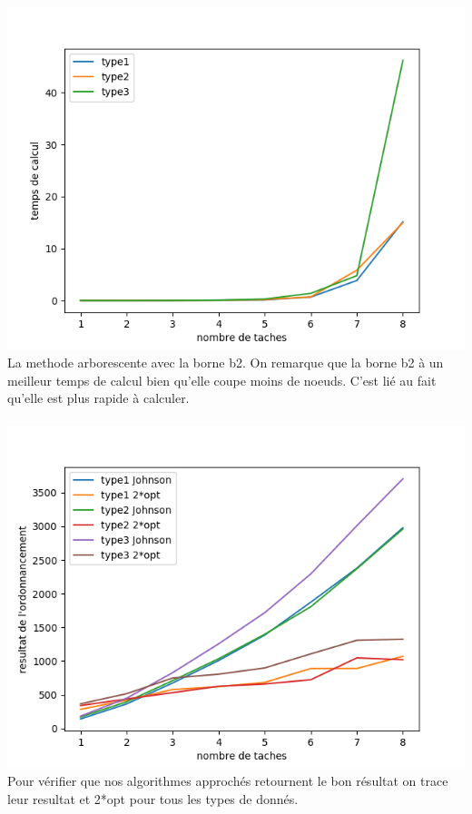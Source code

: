 \documentclass[a4paper, 10pt]{article}
\begin{document}
                \paragraph{}{
                  \includegraphics{graphes/exact_b2.png}
                  La methode arborescente avec la borne b2. On remarque que la borne b2 à un meilleur temps de calcul bien qu'elle coupe moins de noeuds. C'est lié au fait qu'elle est plus rapide à calculer.
                }

                \paragraph{}{
                  \includegraphics{graphes/verifValiditeJohnson.png}
                  Pour vérifier que nos algorithmes approchés retournent le bon résultat on trace leur resultat et 2*opt pour tous les types de donnés.
                }
\end{document}
